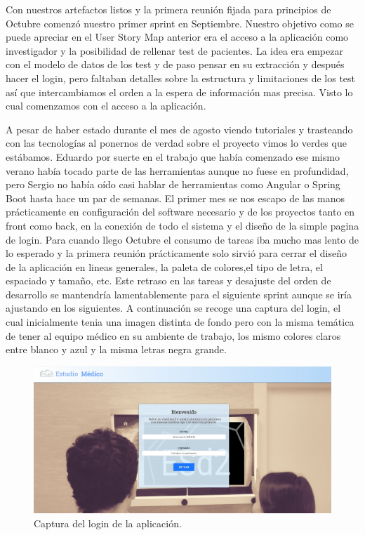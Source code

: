 Con nuestros artefactos listos y la primera reunión fijada para principios de Octubre comenzó nuestro primer sprint en Septiembre. Nuestro objetivo como se puede apreciar en el User Story Map anterior era el acceso a la aplicación como investigador y la posibilidad de rellenar test de pacientes. La idea era empezar con el modelo de datos de los test y de paso pensar en su extracción y después hacer el login, pero faltaban detalles sobre la estructura y limitaciones de los test así que intercambiamos el orden a la espera de información mas precisa. Visto lo cual comenzamos con el acceso a la aplicación.
\newline

A pesar de haber estado durante el mes de agosto viendo tutoriales y trasteando con las tecnologías al ponernos de verdad sobre el proyecto vimos lo verdes que estábamos. Eduardo por suerte en el trabajo que había comenzado ese mismo verano había tocado parte de las herramientas aunque no fuese en profundidad, pero Sergio no había oído casi hablar de herramientas como Angular o Spring Boot hasta hace un par de semanas. El primer mes se nos escapo de las manos prácticamente en configuración del software necesario y de los proyectos tanto en front como back, en la conexión de todo el sistema y el diseño de la simple pagina de login. Para cuando llego Octubre el consumo de tareas iba mucho mas lento de lo esperado y la primera reunión prácticamente solo sirvió para cerrar el diseño de la aplicación en lineas generales, la paleta de colores,el tipo de letra, el espaciado y tamaño, etc. Este retraso en las tareas y desajuste del orden de desarrollo se mantendría lamentablemente para el siguiente sprint aunque se iría ajustando en los siguientes. A continuación se recoge una captura del login, el cual inicialmente tenia una imagen distinta de fondo pero con la misma temática de tener al equipo médico en su ambiente de trabajo, los mismo colores claros entre blanco y azul y la misma letras negra grande.
\newline

 \begin{figure}[h]
    \centering
     \includegraphics[width=1\textwidth]{images/login.jpg}
    \caption{Captura del login de la aplicación.}
\end{figure}
\newpage